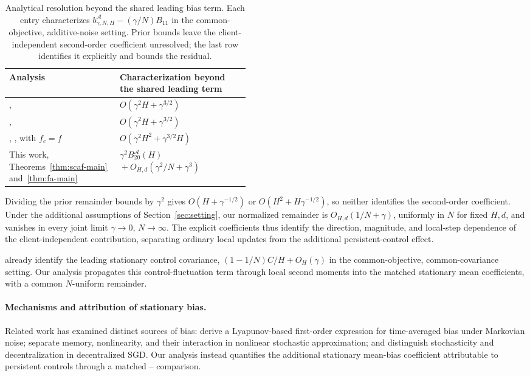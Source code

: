 \begin{table}[htbp]
\centering\small
\caption{Analytical resolution beyond the shared leading bias term. Each entry characterizes $b^{\mathcal A}_{\gamma,N,H}-(\gamma/N)B_{11}$ in the common-objective, additive-noise setting. Prior bounds leave the client-independent second-order coefficient unresolved; the last row identifies it explicitly and bounds the residual.}
\label{tab:prior-bias-resolution}
\begin{tabularx}{\linewidth}{@{}p{0.46\linewidth}X@{}}
\toprule
Analysis & Characterization beyond the shared leading term \\
\midrule
\Scaf{}, \citet[Theorem~5.3]{mangold2025scaffold}
& $O(\gamma^2H+\gamma^{3/2})$ \\
\FedAvg{}, \citet[Theorem~3]{mangold2025fedavg}
& $O(\gamma^2H+\gamma^{3/2})$ \\
\FedAvg{}, \citet[Theorem~4]{mangold2025fedavg}, with $f_c=f$
& $O(\gamma^2H^2+\gamma^{3/2}H)$ \\
This work, Theorems~\ref{thm:scaf-main} and~\ref{thm:fa-main}
& $\gamma^2B_{20}^{\mathcal A}(H)$
  ${}+O_{H,d}(\gamma^2/N+\gamma^3)$ \\
\bottomrule
\end{tabularx}
\end{table}

Dividing the prior remainder bounds by $\gamma^2$ gives $O(H+\gamma^{-1/2})$ or $O(H^2+H\gamma^{-1/2})$, so neither identifies the second-order coefficient. Under the additional assumptions of Section~\ref{sec:setting}, our normalized remainder is $O_{H,d}(1/N+\gamma)$, uniformly in $N$ for fixed $H,d$, and vanishes in every joint limit $\gamma\to0$, $N\to\infty$. The explicit coefficients thus identify the direction, magnitude, and local-step dependence of the client-independent contribution, separating ordinary local updates from the additional persistent-control effect. 

\citet[Lemma~5.1]{mangold2025scaffold} already identify the leading
stationary control covariance, $(1-1/N)C/H+O_H(\gamma)$ in the
common-objective, common-covariance setting. Our analysis propagates
this control-fluctuation term through local second moments into the
matched stationary mean coefficients, with a common $N$-uniform
remainder.


\paragraph{Mechanisms and attribution of stationary bias.}
Related work has examined distinct sources of bias:
\citet{allmeier2024bias} derive a Lyapunov-based first-order expression for time-averaged bias under Markovian noise; \citet{huo2024collusion} separate memory, nonlinearity, and their interaction in nonlinear stochastic approximation; and \citet{versini2026dsgd} distinguish stochasticity and decentralization in decentralized SGD. Our analysis instead quantifies the additional stationary mean-bias coefficient attributable to persistent controls through a matched \Scaf{}--\FedAvg{} comparison.
